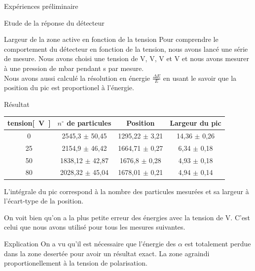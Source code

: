 \documentclass[a4paper,11pt,liststotocnumbered,bibtotocnumbered]{scrartcl}
\begin{document}
\begin{section}{Expériences préliminaire}
\begin{subsection}{Etude de la réponse du détecteur}
   \begin{subsubsection}{Largeur de la zone active en fonction de la tension}
    Pour comprendre le comportement du détecteur en fonction de la tension, nous avons lancé une série de mesure. Nous avons choisi une tension de \unit[0]{V}, \unit[25]{V}, \unit[50]{V} et \unit[80]{V} et nous avons mesurer à une pression de \unit[0,78]{mbar} pendant \unit[30]{s} par mesure.\\
    Nous avons aussi calculé la résolution en énergie $\frac{\Delta E}{E}$ en usant le savoir que la position du pic est proportionel à l'énergie.
    \begin{paragraph}{Résultat} 
     \begin{center}
      \begin{tabular}{c|c|c|c|}
       tension\unit{[V]} & $n^{\circ}$ de particules & Position	& Largeur du pic 	\\ \hline 
       0	&	2545,3  $\pm$ 50,45	&	1295,22	$\pm$ 3,21	&	14,36 $\pm$ 0,26		\\ 
       25	&	2154,9 $\pm$ 46,42	&	1664,71	$\pm$ 0,27	&	6,34 $\pm$ 0,18		\\ 
       50	&	1838,12 $\pm$ 42,87	&	1676,8	$\pm$ 0,28	&	4,93 $\pm$ 0,18		\\ 
       80	&	2028,32 $\pm$ 45,04	&	1678,01	$\pm$ 0,21	&	4,94 $\pm$ 0,14		\\ 
      \end{tabular}
     \end{center}
     L'intégrale du pic correspond à la nombre des particules mesurées et sa largeur à l'écart-type de la position.
 
     On voit bien qu'on a la plus petite erreur des  énergies avec la tension de \unit[80]{V}. C'est celui que nous avons utilisé pour tous les mesures suivantes. 
    \end{paragraph}

    \begin{paragraph}{Explication}
     On a vu qu'il est nécessaire que l'énergie des $\alpha$ est totalement perdue dans la zone desertée pour avoir un résultat exact. La zone agraindi proportionellement à la tension de polarisation.
    \end{paragraph}
   \end{subsubsection}
  \end{subsection} 


\end{section}
\end{document}
